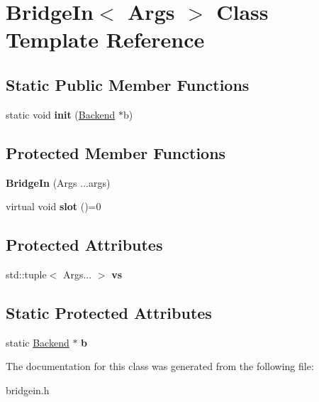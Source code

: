 \hypertarget{classBridgeIn}{}\section{Bridge\+In$<$ Args $>$ Class Template Reference}
\label{classBridgeIn}
\subsection*{Static Public Member Functions}
\begin{DoxyCompactItemize}
\item 
\mbox{\label{classBridgeIn_adf69668cdc4d34e098debd575b900956}} 
static void {\bfseries init} (\mbox{\hyperlink{classBackend}{Backend}} $\ast$b)
\end{DoxyCompactItemize}
\subsection*{Protected Member Functions}
\begin{DoxyCompactItemize}
\item 
\mbox{\label{classBridgeIn_a1a0ca3df970f3647b6e91a0bf163c821}} 
{\bfseries Bridge\+In} (Args ...args)
\item 
\mbox{\label{classBridgeIn_abb281d1d468d685a25f533c8dc71c423}} 
virtual void {\bfseries slot} ()=0
\end{DoxyCompactItemize}
\subsection*{Protected Attributes}
\begin{DoxyCompactItemize}
\item 
\mbox{\label{classBridgeIn_a99b30a1ebd4a1d07cce2896b13ac6fc4}} 
std\+::tuple$<$ Args... $>$ {\bfseries vs}
\end{DoxyCompactItemize}
\subsection*{Static Protected Attributes}
\begin{DoxyCompactItemize}
\item 
\mbox{\label{classBridgeIn_af327eaea53a147fa8067a270c13c53eb}} 
static \mbox{\hyperlink{classBackend}{Backend}} $\ast$ {\bfseries b}
\end{DoxyCompactItemize}


The documentation for this class was generated from the following file\+:\begin{DoxyCompactItemize}
\item 
bridgein.\+h\end{DoxyCompactItemize}
